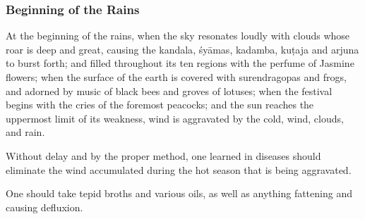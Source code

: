 \begin{translation}

\subsubsection{Beginning of the Rains}%

\item[62--65] %
At the beginning of the rains, %
when the sky %
resonates loudly %
with clouds whose roar is deep and great,  %
%
causing the \gls{kandala}, %
\glspl{śyāma}, %
\gls{kadamba}, %
\gls{kuṭaja} %
and \gls{arjuna} to burst forth; %
%
and filled %
throughout its ten regions  %
with the perfume of Jasmine flowers;%
%
when the surface of the earth %
is covered %
with \glspl{surendragopa} %
and frogs, %
and adorned by %
music of black bees %
and groves of lotuses; 
%
when the festival begins with the cries of the foremost peacocks; %
and the sun reaches the uppermost limit of its weakness, %
%
wind is aggravated by the cold, wind, clouds, and rain.

\item[66]
Without delay %
and by the proper method, %
one learned in diseases %
should eliminate %
the wind accumulated during the hot season %
that is being aggravated. %

\item[67]
One should take %
tepid %
broths %
and various oils, %
as well as anything fattening %
and causing defluxion. %


\end{translation}
